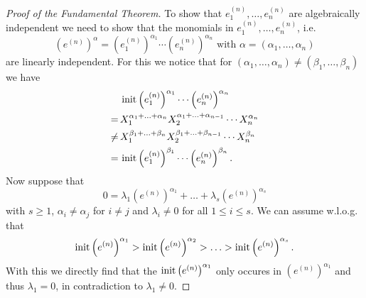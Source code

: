 \begin{proof}[Proof of the Fundamental Theorem]
 To show that $e^{(n)}_1, \ldots, e^{(n)}_n$ are algebraically independent we need to show that the monomials in $e^{(n)}_1, \ldots, e^{(n)}_n$, i.e.
 \[
  \left(e^{(n)}\right)^\alpha = \left(e^{(n)}_1\right)^{\alpha_1} \cdots \left(e^{(n)}_n\right)^{\alpha_n} \text{ with } \alpha = (\alpha_1, \ldots, \alpha_n)
 \]
 are linearly independent. For this we notice that for $(\alpha_1, \ldots, \alpha_n) \neq (\beta_1, \ldots, \beta_n)$ we have
 \begin{align*}
      &\, \operatorname{init} \left(e^{(n)}_1\right)^{\alpha_1} \cdots \left(e^{(n)}_n\right)^{\alpha_n} \\
     =&\, X_1^{\alpha_1 + \ldots + \alpha_n} X_2^{\alpha_1 + \ldots + \alpha_{n-1}} \cdots X_n^{\alpha_n} \\
  \neq&\, X_1^{\beta_1 + \ldots + \beta_n} X_2^{\beta_1 + \ldots + \beta_{n-1}} \cdots X_n^{\beta_n} \\
     =&\, \operatorname{init} \left(e^{(n)}_1\right)^{\beta_1} \cdots \left(e^{(n)}_n\right)^{\beta_n}.
 \end{align*}
 Now suppose that
 \[
  0 = \lambda_1 \left(e^{(n)}\right)^{\alpha_1} + \ldots + \lambda_s \left(e^{(n)}\right)^{\alpha_s}
 \]
 with $s \geq 1$, $\alpha_i \neq \alpha_j$ for $i \neq j$ and $\lambda_i \neq 0$ for all $1 \leq i \leq s$. We can assume w.l.o.g. that 
 \[
  \operatorname{init} \left(e^{(n)}\right)^{\alpha_1} > \operatorname{init} \left(e^{(n)}\right)^{\alpha_2} > \ldots > \operatorname{init} \left(e^{(n)}\right)^{\alpha_s}.
 \]
 With this we directly find that the $\operatorname{init} \left(e^{(n)}\right)^{\alpha_1}$ only occures in $\left(e^{(n)}\right)^{\alpha_1}$ and thus $\lambda_1 = 0$, in contradiction to $\lambda_1 \neq 0$.
\end{proof}


